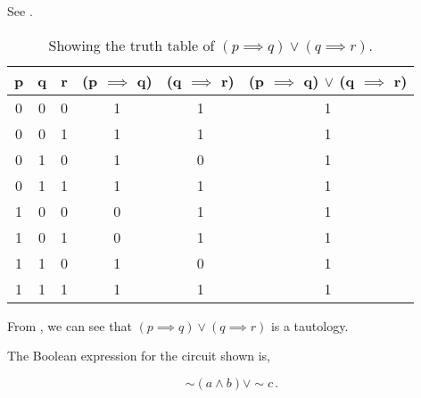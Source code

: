 \begin{subquestions}
\subquestion

\begin{subsubquestions}
	
\subsubquestion

See .

\begin{table}[ht]
	\centering
	\begin{tabular}{|c|c|c|c|c|c|}
		\hline
		p & q & r & (p $\implies$ q) & (q $\implies$ r) & (p $\implies$ q) $\lor$ (q $\implies$ r) \\
		\hline
		0 & 0 & 0 & 1 & 1 & 1 \\
		0 & 0 & 1 & 1 & 1 & 1 \\
		0 & 1 & 0 & 1 & 0 & 1 \\
		0 & 1 & 1 & 1 & 1 & 1 \\
		1 & 0 & 0 & 0 & 1 & 1 \\
		1 & 0 & 1 & 0 & 1 & 1 \\
		1 & 1 & 0 & 1 & 0 & 1 \\
		1 & 1 & 1 & 1 & 1 & 1 \\
		\hline
	\end{tabular}
	\caption{\label{2014:q1:tab:Tab2} Showing the truth table of $(p \implies q) \lor (q \implies r)$.}
\end{table}

\subsubquestion

From , we can see that $(p \implies q) \lor (q \implies r)$ is a tautology.
\end{subsubquestions}


\subquestion

The Boolean expression for the circuit shown is,

\begin{equation}
	\sim (a \land b) \lor \sim c\,.
\end{equation}


\subquestion

\begin{subsubquestions}


\end{subsubquestions}
\end{subquestions}

